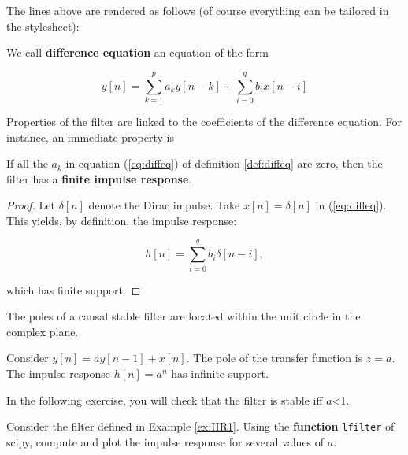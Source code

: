     The lines above are rendered as follows (of course everything can be
tailored in the stylesheet):

\begin{definition} \label{def:diffeq}
We call
\textbf{difference equation} an equation of the form


\begin{equation}
\label{eq:diffeq}
y[n]= \sum_{k=1}^{p} a_k y[n-k] + \sum_{i=0}^q b_i x[n-i]
\end{equation}


\end{definition} Properties of the filter are linked to the
coefficients of the difference equation. For instance, an immediate
property is

\begin{property}
If all the \(a_k\) in equation
(\ref{eq:diffeq}) of definition \ref{def:diffeq} are zero, then the
filter has a \textbf{finite impulse response}.

\end{property}

\begin{proof}
Let \(\delta[n]\) denote the Dirac impulse.
Take \(x[n]=\delta[n]\) in (\ref{eq:diffeq}). This yields, by
definition, the impulse response:


\begin{equation}
\label{eq:fir}
h[n]= \sum_{i=0}^q b_i \delta[n-i],
\end{equation}


which has finite support. 
\end{proof}

\begin{theorem}
The poles of a causal stable filter are
located within the unit circle in the complex
plane.
\end{theorem}

\begin{example} \label{ex:IIR1}
Consider
\(y[n]= a y[n-1] + x[n]\). The pole of the transfer function is \(z=a\).
The impulse response \(h[n]=a^n\) has infinite
support.
\end{example}

In the following exercise, you will check that the filter is stable iff
\(a\)\textless{}1.

\begin{exercise}\label{ex:exofilter}
Consider the filter
defined in Example \ref{ex:IIR1}. Using the \textbf{function}
\texttt{lfilter} of scipy, compute and plot the impulse response for
several values of \(a\).
\end{exercise}

